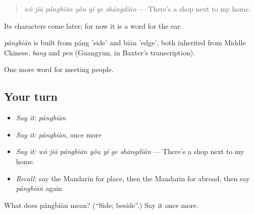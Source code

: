 \begin{quote}
\emph{wǒ jiā pángbiān yǒu yí ge shāngdiàn} — There's a shop next to my home.
\end{quote}

Its characters come later; for now it is a word for the ear.

\begin{cousinweb}
\emph{pángbiān} is built from páng 'side' and biān 'edge', both inherited from Middle Chinese, \emph{bang} and \emph{pen} (Guangyun, in Baxter's transcription).
\end{cousinweb}

\begin{grammarlens}[title={What you've built}]
One more word for meeting people.
\end{grammarlens}

\subsection*{Your turn}
\begin{itemize}
\raggedright
  \item \emph{Say it:} \emph{pángbiān}
  \item \emph{Say it:} \emph{pángbiān}, once more
  \item \emph{Say it:} \emph{wǒ jiā pángbiān yǒu yí ge shāngdiàn} — There's a shop next to my home.
  \item \emph{Recall:} say the Mandarin for place, then the Mandarin for abroad, then say \emph{pángbiān} again
\end{itemize}

\begin{tcolorbox}[breakable,colback=teal!4,colframe=teal!35!black,title={Before you move on}]
What does pángbiān mean? (\textquotedblleft{}Side; beside\textquotedblright{}.) Say it once more.
\end{tcolorbox}
